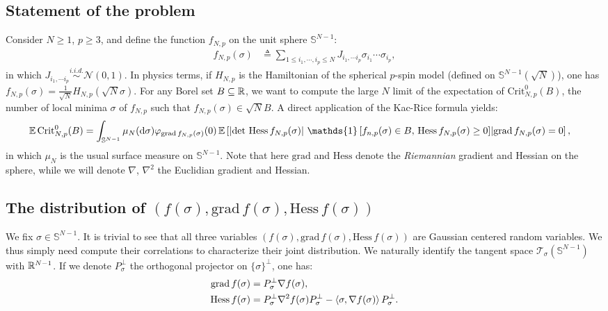 \documentclass[amsmath,amssymb,nofootinbib,prd]{article}
\begin{document}
	\subsection{Statement of the problem}
	Consider $N \geq 1$, $p \geq 3$, and define the function $f_{N,p}$ on the unit sphere $\mathbb{S}^{N-1}$:
	\begin{align}
	f_{N,p}(\sigma) &\triangleq \sum_{1 \leq i_1,\cdots,i_p \leq N} J_{i_1,\cdots i_p} \sigma_{i_1} \cdots \sigma_{i_p},
	\end{align}
	in which $J_{i_1,\cdots i_p} \overset{i.i.d.}{\sim} \mathcal{N}(0,1)$. In physics terms, if $H_{N,p}$ is the Hamiltonian of the spherical $p$-spin model (defined on $\mathbb{S}^{N-1}(\sqrt{N})$), one has $f_{N,p}(\sigma) = \frac{1}{\sqrt{N}} H_{N,p}(\sqrt{N}\sigma)$.  For any Borel set $B \subseteq \mathbb{R}$, we want to compute the large $N$ limit of the expectation of $\mathrm{Crit}_{N,p}^0(B)$, the number of local minima $\sigma$ of $f_{N,p}$ such that $f_{N,p}(\sigma) \in \sqrt{N} B$. 
	A direct application of the Kac-Rice formula yields:
	\begin{align*}
	\EE \, \mathrm{Crit}_{N,p}^0(B) &= \int_{\mathbb{S}^{N-1}} \mu_N(\mathrm{d}\sigma) \varphi_{\mathrm{grad}\, f_{N,p}(\sigma)}(0) \, \EE \left[\left|\det \, \mathrm{Hess}\, f_{N,p}(\sigma)\right| \, \mathds{1}\left[f_{n,p}(\sigma) \in B,\, \mathrm{Hess}\, f_{N,p}(\sigma) \geq 0\right] \middle| \mathrm{grad}\, f_{N,p}(\sigma) = 0 \right],
	\end{align*}
in which $\mu_N$ is the usual surface measure on $\mathbb{S}^{N-1}$. Note that here $\mathrm{grad}$ and $\mathrm{Hess}$ denote the \emph{Riemannian} gradient and Hessian on the sphere, while we will denote $\nabla$, $\nabla^2$ the Euclidian gradient and Hessian. 
	
	\subsection{The distribution of $(f(\sigma),\mathrm{grad}\, f(\sigma),\mathrm{Hess}\, f(\sigma))$}
	
	We fix $\sigma  \in \mathbb{S}^{N-1}$. It is trivial to see that all three variables $(f(\sigma),\mathrm{grad}\, f(\sigma),\mathrm{Hess}\, f(\sigma))$ are Gaussian centered random variables. We thus simply need compute their correlations to characterize their joint distribution. We naturally identify the tangent space $\mathcal{T}_\sigma(\mathbb{S}^{N-1})$ with $\mathbb{R}^{N-1}$. If we denote $P_\sigma^\perp$ the orthogonal projector on $\{\sigma\}^\perp$, one has:
	\begin{align}
	\mathrm{grad}\, f(\sigma) &= P_\sigma^\perp \nabla f(\sigma), \\
	\mathrm{Hess}\, f(\sigma) &= P_\sigma^\perp \nabla^2 f(\sigma) P_{\sigma}^\perp - \braket{\sigma,\nabla f(\sigma)} P_\sigma^\perp.
	\end{align}
	
\end{document}
